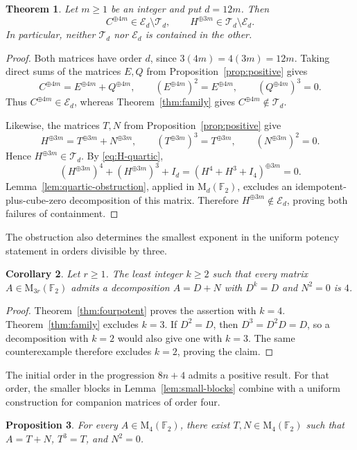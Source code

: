 \documentclass[12pt]{amsart}
\newtheorem{theorem}{Theorem}[section]
\newtheorem{proposition}[theorem]{Proposition}
\newtheorem{corollary}[theorem]{Corollary}
\theoremstyle{remark}
\numberwithin{equation}{section}
\theoremstyle{definition}
\newcommand{\F}{\mathbb F}
\newcommand{\Mat}{\mathrm M}
\newcommand{\Id}{I}
\newcommand{\TS}{\mathcal T}
\newcommand{\IC}{\mathcal E}
\begin{document}
\begin{theorem}\label{thm:comparison}
Let $m\geq1$ be an integer and put $d=12m$. Then
\[
 C^{\oplus4m}\in\IC_d\setminus\TS_d,
 \qquad
 H^{\oplus3m}\in\TS_d\setminus\IC_d.
\]
In particular, neither $\TS_d$ nor $\IC_d$ is contained in the other.
\end{theorem}

\begin{proof}
Both matrices have order $d$, since $3(4m)=4(3m)=12m$. Taking direct sums of the matrices $E,Q$ from Proposition~\ref{prop:positive} gives
\[
 C^{\oplus4m}=E^{\oplus4m}+Q^{\oplus4m},\qquad
 (E^{\oplus4m})^2=E^{\oplus4m},\qquad
 (Q^{\oplus4m})^3=0.
\]
Thus $C^{\oplus4m}\in\IC_d$, whereas Theorem~\ref{thm:family} gives $C^{\oplus4m}\notin\TS_d$.

Likewise, the matrices $T,N$ from Proposition~\ref{prop:positive} give
\[
 H^{\oplus3m}=T^{\oplus3m}+N^{\oplus3m},\qquad
 (T^{\oplus3m})^3=T^{\oplus3m},\qquad
 (N^{\oplus3m})^2=0.
\]
Hence $H^{\oplus3m}\in\TS_d$. By \eqref{eq:H-quartic},
\[
 (H^{\oplus3m})^4+(H^{\oplus3m})^3+\Id_d
 =(H^4+H^3+\Id_4)^{\oplus3m}=0.
\]
Lemma~\ref{lem:quartic-obstruction}, applied in $\Mat_d(\F_2)$, excludes an idempotent-plus-cube-zero decomposition of this matrix. Therefore $H^{\oplus3m}\notin\IC_d$, proving both failures of containment.
\end{proof}

The obstruction also determines the smallest exponent in the uniform potency statement in orders divisible by three.

\begin{corollary}\label{cor:optimal}
Let $r\geq1$. The least integer $k\geq2$ such that every matrix $A\in\Mat_{3r}(\F_2)$ admits a decomposition $A=D+N$ with $D^k=D$ and $N^2=0$ is $4$.
\end{corollary}

\begin{proof}
Theorem~\ref{thm:fourpotent} proves the assertion with $k=4$. Theorem~\ref{thm:family} excludes $k=3$. If $D^2=D$, then $D^3=D^2D=D$, so a decomposition with $k=2$ would also give one with $k=3$. The same counterexample therefore excludes $k=2$, proving the claim.
\end{proof}


The initial order in the progression $8n+4$ admits a positive result. For that order, the smaller blocks in Lemma~\ref{lem:small-blocks} combine with a uniform construction for companion matrices of order four.

\begin{proposition}\label{prop:order-four}
For every $A\in\Mat_4(\F_2)$, there exist $T,N\in\Mat_4(\F_2)$ such that $A=T+N$, $T^3=T$, and $N^2=0$.
\end{proposition}
\end{document}
